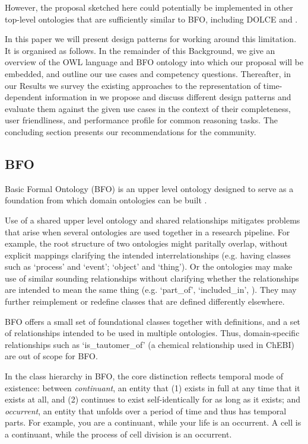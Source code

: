 \documentclass[10pt]{bmc_article}
\newenvironment{bmcformat}{\baselineskip20pt\sloppy\setboolean{publ}{false}}{\baselineskip20pt\sloppy}
\begin{document}
\begin{bmcformat}
 However,
the proposal sketched here could potentially be implemented in other top-level
ontologies that are sufficiently similar to BFO, including DOLCE \cite{DOLCE:ref} and \cite{GFO:ref}.

In this paper we will present design patterns for working around this limitation. It is organised as follows.
In the remainder of this Background, we give an overview of the OWL language and BFO ontology into which our proposal will be embedded, and outline our use cases and competency questions. 
Thereafter, in our Results we survey the existing approaches to the representation of time-dependent information in 
we propose and discuss different design patterns and evaluate them against the given use cases in the context of their completeness, user friendliness, and performance profile for common reasoning tasks.
The concluding section presents our recommendations for the community.

\subsection*{BFO}

Basic Formal Ontology (BFO) is an upper level ontology designed to serve as a foundation from which domain ontologies can be built \cite{BFO2:Graz}. 

Use of a shared upper level ontology and shared relationships mitigates problems that arise when several ontologies are used together in a research pipeline. For example, the root structure of two ontologies might paritally overlap, without explicit mappings clarifying the intended interrelationships (e.g. having classes such as `process' and `event'; `object' and `thing'). Or the ontologies may make use of similar sounding relationships without clarifying whether the relationships are intended to mean the same thing (e.g. `part\_of', `included\_in', ). They may further reimplement or redefine classes that are defined differently elsewhere.

BFO offers a small set of foundational classes together with definitions, and a set of relationships intended to be used in multiple ontologies. Thus, domain-specific relationships such as `is\_tautomer\_of' (a chemical relationship used in ChEBI) are out of scope for BFO. 

In the class hierarchy in BFO, the core distinction reflects temporal mode of existence: between \textit{continuant}, an entity that (1) exists in full at any time that it exists at all, and (2) continues to exist self-identically for as long as it exists; and \textit{occurrent}, an entity that unfolds over a period of time and thus has temporal parts.  For example, you are a continuant, while your life is an occurrent.  A cell is a continuant, while the process of cell division is an occurrent.  


\end{bmcformat}
\end{document}
